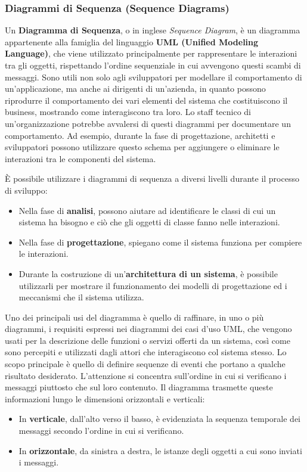 \subsubsection{Diagrammi di Sequenza (Sequence Diagrams)}
Un \textbf{Diagramma di Sequenza}, o in inglese \textit{Sequence Diagram}, è un diagramma appartenente alla famiglia del linguaggio \textbf{UML (Unified Modeling Language)}, che viene utilizzato principalmente per rappresentare le interazioni tra gli oggetti, rispettando l'ordine sequenziale in cui avvengono questi scambi di messaggi. Sono utili non solo agli sviluppatori per modellare il comportamento di un'applicazione, ma anche ai dirigenti di un'azienda, in quanto possono riprodurre il comportamento dei vari elementi del sistema che costituiscono il business, mostrando come interagiscono tra loro. Lo staff tecnico di un'organizzazione potrebbe avvalersi di questi diagrammi per documentare un comportamento. Ad esempio, durante la fase di progettazione, architetti e sviluppatori possono utilizzare questo schema per aggiungere o eliminare le interazioni tra le componenti del sistema.

È possibile utilizzare i diagrammi di sequenza a diversi livelli durante il processo di sviluppo:
\begin{itemize}
    \item Nella fase di \textbf{analisi}, possono aiutare ad identificare le classi di cui un sistema ha bisogno e ciò che gli oggetti di classe fanno nelle interazioni.
    \item Nella fase di \textbf{progettazione}, spiegano come il sistema funziona per compiere le interazioni.
    \item Durante la costruzione di un'\textbf{architettura di un sistema}, è possibile utilizzarli per mostrare il funzionamento dei modelli di progettazione ed i meccanismi che il sistema utilizza.
\end{itemize}
Uno dei principali usi del diagramma è quello di raffinare, in uno o più diagrammi, i requisiti espressi nei diagrammi dei casi d'uso UML, che vengono usati per la descrizione delle funzioni o servizi offerti da un sistema, così come sono percepiti e utilizzati dagli attori che interagiscono col sistema stesso.
Lo scopo principale è quello di definire sequenze di eventi che portano a qualche risultato desiderato. L'attenzione si concentra sull'ordine in cui si verificano i messaggi piuttosto che sul loro contenuto. Il diagramma trasmette queste informazioni lungo le dimensioni orizzontali e verticali:
\begin{itemize}
    \item In \textbf{verticale}, dall'alto verso il basso, è evidenziata la sequenza temporale dei messaggi secondo l'ordine in cui si verificano.
    \item In \textbf{orizzontale}, da sinistra a destra, le istanze degli oggetti a cui sono inviati i messaggi.
\end{itemize}

